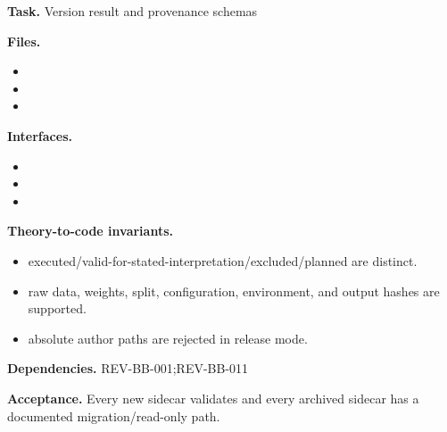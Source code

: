 \begin{statusbox}[CODE-BB-010]
\textbf{Task.} Version result and provenance schemas\par
\textbf{Files.}
\begin{itemize}[leftmargin=1.7em,itemsep=1.5pt,topsep=2pt]
\item {}
\item {}
\item {}
\end{itemize}
\textbf{Interfaces.}
\begin{itemize}[leftmargin=1.7em,itemsep=1.5pt,topsep=2pt]
\item {}
\item {}
\item {}
\end{itemize}
\textbf{Theory-to-code invariants.}
\begin{itemize}[leftmargin=1.7em,itemsep=1.5pt,topsep=2pt]
\item executed/valid-for-stated-interpretation/excluded/planned are distinct.
\item raw data, weights, split, configuration, environment, and output hashes are supported.
\item absolute author paths are rejected in release mode.
\end{itemize}
\textbf{Dependencies.} REV-BB-001;REV-BB-011\par
\textbf{Acceptance.} Every new sidecar validates and every archived sidecar has a documented migration/read-only path.
\end{statusbox}

